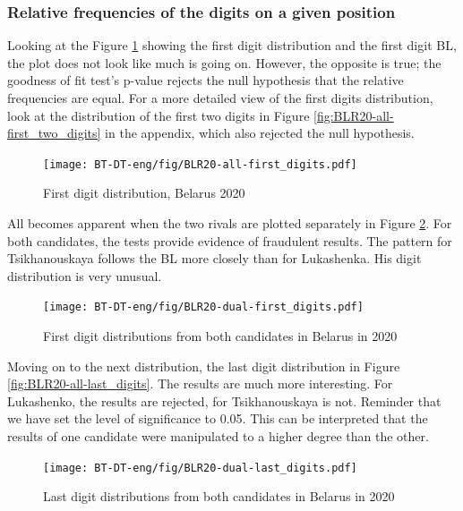 \subsubsection{Relative frequencies of the digits on a given position}

Looking at the Figure \ref{fig:BLR20-all-first_digits} showing the first digit distribution and the first digit BL, the plot does not look like much is going on. However, the opposite is true; the goodness of fit test's p-value rejects the null hypothesis that the relative frequencies are equal. For a more detailed view of the first digits distribution, look at the distribution of the first two digits in Figure \ref{fig:BLR20-all-first_two_digits} in the appendix, which also rejected the null hypothesis. 

\begin{figure}[h]
    \centering
    \caption{First digit distribution, Belarus 2020}
    \texttt{[image: BT-DT-eng/fig/BLR20-all-first\_digits.pdf]}
    \label{fig:BLR20-all-first_digits}
\end{figure}

All becomes apparent when the two rivals are plotted separately in Figure \ref{fig:BLR20-dual-first_digits}. For both candidates, the tests provide evidence of fraudulent results. The pattern for Tsikhanouskaya follows the BL more closely than for Lukashenka. His digit distribution is very unusual.

\begin{figure}[h]
    \centering
    \caption{First digit distributions from both candidates in Belarus in 2020}
    \texttt{[image: BT-DT-eng/fig/BLR20-dual-first\_digits.pdf]}
    \label{fig:BLR20-dual-first_digits}
\end{figure}

Moving on to the next distribution, the last digit distribution in Figure \ref{fig:BLR20-all-last_digits}. The results are much more interesting. For Lukashenko, the results are rejected, for Tsikhanouskaya is not. Reminder that we have set the level of significance to 0.05. This can be interpreted that the results of one candidate were manipulated to a higher degree than the other.  

\begin{figure}[h]
    \centering
    \caption{Last digit distributions from both candidates in Belarus in 2020}
    \texttt{[image: BT-DT-eng/fig/BLR20-dual-last\_digits.pdf]}
    \label{fig:BLR20-dual-last_digits}
\end{figure}

